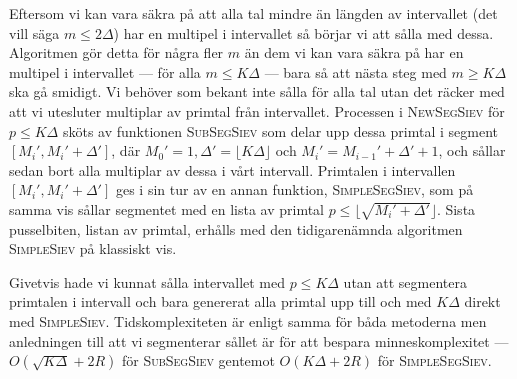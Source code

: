 Eftersom vi kan vara säkra på att alla tal mindre än längden av intervallet (det vill säga \(m \leq 2 \Delta\)) har en multipel i intervallet så börjar vi att sålla med dessa. Algoritmen gör detta för några fler \(m\) än dem vi kan vara säkra på har en multipel i intervallet --- för alla \(m \leq K \Delta\) --- bara så att nästa steg med \(m \geq K \Delta\) ska gå smidigt. Vi behöver som bekant inte sålla för alla tal utan det räcker med att vi utesluter multiplar av primtal från intervallet. Processen i \textsc{NewSegSiev} för \(p \leq K \Delta\) sköts av funktionen \textsc{SubSegSiev} som delar upp dessa primtal i segment \([M_i', M_i' + \Delta']\), där \(M_0' = 1, \Delta' = \lfloor K \Delta \rfloor\) och \(M_i' = M_{i-1}' + \Delta' + 1\), och sållar sedan bort alla multiplar av dessa i vårt intervall. Primtalen i intervallen \([M_i', M_i' + \Delta']\) ges i sin tur av en annan funktion, \textsc{SimpleSegSiev}, som på samma vis sållar segmentet med en lista av primtal \(p \leq \lfloor\sqrt{M_i' + \Delta'}\rfloor\). Sista pusselbiten, listan av primtal, erhålls med den tidigarenämnda algoritmen \textsc{SimpleSiev} på klassiskt vis. 

Givetvis hade vi kunnat sålla intervallet med \(p \leq K \Delta\) utan att segmentera primtalen i intervall och bara genererat alla primtal upp till och med \(K \Delta\) direkt med \textsc{SimpleSiev}. Tidskomplexiteten är enligt \cite{HaraldSieve} samma för båda metoderna men anledningen till att vi segmenterar sållet är för att bespara minneskomplexitet --- \(O(\sqrt{K \Delta} + 2R)\) för \textsc{SubSegSiev} gentemot \(O(K \Delta + 2R)\) för \textsc{SimpleSegSiev}. 


